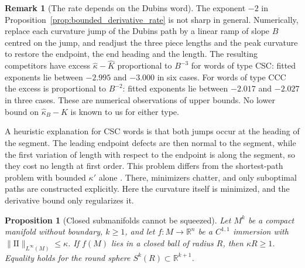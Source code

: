 \documentclass[11pt,reqno]{amsart}
\newtheorem{proposition}[theorem]{Proposition}
\theoremstyle{definition}
\newtheorem{remark}[theorem]{Remark}
\providecommand{\R}{\mathbb{R}}
\providecommand{\II}{\mathrm{I\!I}}
\numberwithin{equation}{section}
\providecommand{\II}{\mathrm{II}}
\providecommand{\R}{\mathbb{R}}
\begin{document}
\begin{remark}[The rate depends on the Dubins word]
The exponent $-2$ in Proposition~\ref{prop:bounded_derivative_rate} is not sharp in general. Numerically, replace each curvature jump of the Dubins path by a linear ramp of slope $B$ centred on the jump, and readjust the three piece lengths and the peak curvature to restore the endpoint, the end heading and the length. The resulting competitors have excess $\hat\kappa - \hat K$ proportional to $B^{-3}$ for words of type CSC: fitted exponents lie between $-2.995$ and $-3.000$ in six cases. For words of type CCC the excess is proportional to $B^{-2}$: fitted exponents lie between $-2.017$ and $-2.027$ in three cases. These are numerical observations of upper bounds. No lower bound on $\hat\kappa_B - \hat K$ is known to us for either type.

A heuristic explanation for CSC words is that both jumps occur at the heading of the segment. The leading endpoint defects are then normal to the segment, while the first variation of length with respect to the endpoint is along the segment, so they cost no length at first order. This problem differs from the shortest-path problem with bounded $\kappa'$ alone \cite{bcl1994,kostov1995}. There, minimizers chatter, and only suboptimal paths are constructed explicitly. Here the curvature itself is minimized, and the derivative bound only regularizes it.
\end{remark}

\begin{proposition}[Closed submanifolds cannot be squeezed]
\label{prop:ball_bound}
Let $M^k$ be a compact manifold without boundary, $k \ge 1$, and let $f\colon M \to \R^n$ be a $C^{1,1}$ immersion with $\|\II\|_{L^\infty(M)} \le \kappa$. If $f(M)$ lies in a closed ball of radius $R$, then $\kappa R \ge 1$. Equality holds for the round sphere $S^k(R) \subset \R^{k+1}$.
\end{proposition}
\end{document}
